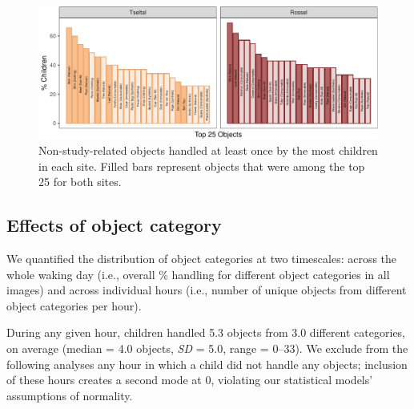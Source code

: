 \documentclass[10pt, letterpaper]{article}
\newenvironment{CodeChunk}{}{}
\begin{document}
\begin{CodeChunk}
\begin{figure}[!ht]

{\centering \includegraphics{figs/top-objects-fig-1} 

}

\caption[Non-study-related objects handled at least once by the most children in each site]{Non-study-related objects handled at least once by the most children in each site. Filled bars represent objects that were among the top 25 for both sites.}\label{fig:top-objects-fig}
\end{figure}
\end{CodeChunk}

\hypertarget{effects-of-object-category}{%
\subsection{Effects of object
category}\label{effects-of-object-category}}

We quantified the distribution of object categories at two timescales:
across the whole waking day (i.e., overall \% handling for different
object categories in all images) and across individual hours (i.e.,
number of unique objects from different object categories per hour).

During any given hour, children handled 5.3 objects from 3.0 different
categories, on average (median = 4.0 objects, \emph{SD} = 5.0, range =
0--33). We exclude from the following analyses any hour in which a child
did not handle any objects; inclusion of these hours creates a second
mode at 0, violating our statistical models' assumptions of normality.
\end{document}
